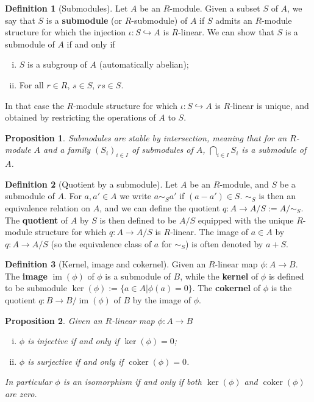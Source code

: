 \documentclass[a4paper,12pt,parskip=half*,chapterprefix=true,numbers=noendperiod]{scrreprt}
\newcommand{\opname}{\operatorname}
\newtheorem{proposition}{Proposition}[section]
\theoremstyle{definition}
\newtheorem{definition}{Definition}[section]
\theoremstyle{remark}
\begin{document}
\begin{definition}[Submodules]
	Let $A$ be an $R$-module. Given a subset $S$ of $A$, we say that $S$ is a \textbf{submodule} (or $R$-submodule) of $A$ if $S$ admits an $R$-module structure for which the injection $\iota:S\hookrightarrow A$ is $R$-linear. We can show that $S$ is a submodule of $A$ if and only if
	\begin{enumerate}[(i)]
		\item $S$ is a subgroup of $A$ (automatically abelian);
		\item For all $r\in R$, $s\in S$, $rs\in S$.
	\end{enumerate}
	In that case the $R$-module structure for which $\iota:S\hookrightarrow A$ is $R$-linear is unique, and obtained by restricting the operations of $A$ to $S$.
\end{definition}

\begin{proposition}
	Submodules are stable by intersection, meaning that for an $R$-module $A$ and a family $(S_i)_{i\in I}$ of submodules of $A$, $\bigcap_{i\in I}S_i$ is a submodule of $A$.
\end{proposition}

\begin{definition}[Quotient by a submodule]
	Let $A$ be an $R$-module, and $S$ be a submodule of $A$. For $a,a'\in A$ we write $a\sim_S a'$ if $(a-a')\in S$. $\sim_S$ is then an equivalence relation on $A$, and we can define the quotient $q:A\to A/S:=A/\sim_S$. The \textbf{quotient} of $A$ by $S$ is then defined to be $A/S$ equipped with the unique $R$-module structure for which $q:A\to A/S$ is $R$-linear. The image of $a\in A$ by $q:A\to A/S$ (so the equivalence class of $a$ for $\sim_S$) is often denoted by $a+S$.
\end{definition}
\begin{definition}[Kernel, image and cokernel]
	Given an $R$-linear map $\phi:A\to B$. The \textbf{image} $\opname{im}(\phi)$ of $\phi$ is a submodule of $B$, while the \textbf{kernel} of $\phi$ is defined to be submodule $\ker(\phi):=\{a\in A|\phi(a)=0\}$. The \textbf{cokernel} of $\phi$ is the quotient $q:B\to B/\opname{im}(\phi)$ of $B$ by the image of $\phi$.
\end{definition}

\begin{proposition}
	Given an $R$-linear map $\phi:A\to B$
	\begin{enumerate}[(i)]
		\item $\phi$ is injective if and only if $\ker(\phi)=0$;
		\item $\phi$ is surjective if and only if $\opname{coker}(\phi)=0$.
	\end{enumerate}
	In particular $\phi$ is an isomorphism if and only if both $\ker(\phi)$ and $\opname{coker}(\phi)$ are zero.
\end{proposition}
\end{document}
